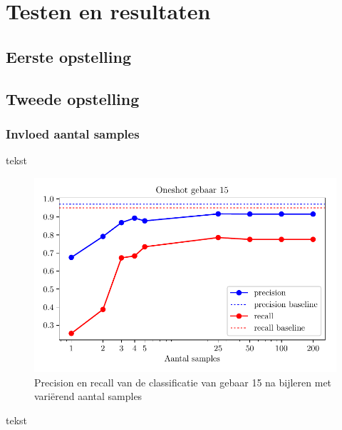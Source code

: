 \chapter{Testen en resultaten}
\section{Eerste opstelling}
\section{Tweede opstelling}
\subsection{Invloed aantal samples}
tekst
\begin{figure}[ht]
  \begin{center}
    \includegraphics[]{figuren/oneshot-gebaar15.pdf}
    \caption{Precision en recall van de classificatie van gebaar 15 na bijleren met vari\"erend aantal samples\label{gebaar15}}
  \end{center}
\end{figure}
tekst
